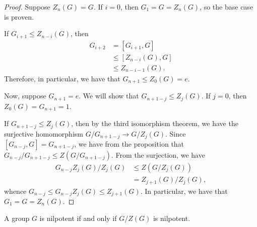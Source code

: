 \documentclass[10pt]{mypackage}
\begin{document}
\begin{proof}
  Suppose $Z_n(G) = G$. If $i = 0$, then $G_1 = G = Z_n(G)$, so the base case is proven.%

  If $G_{i+1}\leq Z_{n-i}(G)$, then
  \begin{align*}
    G_{i+2} &= \left[ G_{i+1},G \right]\\
            &\leq \left[ Z_{n-i}(G),G \right]\\
            &\leq Z_{n-i-1}(G).
  \end{align*}
  Therefore, in particular, we have that $G_{n+1}\leq Z_{0}(G) = e$.%

  Now, suppose $G_{n+1} = e$. We will show that $G_{n+1-j}\leq Z_{j}(G)$. If $j = 0$, then $Z_0(G) = G_{n+1} = 1$. 

  If $G_{n+1-j}\leq Z_j(G)$, then by the third isomorphism theorem, we have the surjective homomorphism $G/G_{n+1-j}\rightarrow G/Z_j(G)$. Since $\left[ G_{n-j},G \right] = G_{n+1-j}$, we have from the proposition that $G_{n-j}/G_{n+1-j}\leq Z\left( G/G_{n+1-j} \right)$. From the surjection, we have
  \begin{align*}
    G_{n-j}Z_j(G)/Z_j(G) &\leq Z\left( G/Z_j(G) \right)\\
                         &= Z_{j+1}(G)/Z_j(G),
  \end{align*}
  whence $G_{n-j}\leq G_{n-j}Z_j(G)\leq Z_{j+1}(G)$. In particular, we have that $G_1 = G = Z_n(G)$.
\end{proof}
\begin{proposition}
  A group $G$ is nilpotent if and only if $G/Z(G)$ is nilpotent.
\end{proposition}
\end{document}
